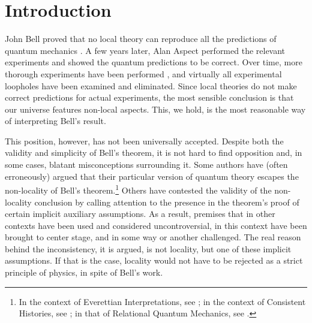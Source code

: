 \documentclass[letterpaper,12pt]{article}
\begin{document}
\onehalfspacing
\section{Introduction}
	
John Bell proved that no local theory can reproduce all the predictions of quantum mechanics \cite{Bell1964,Bell1971,Bell1976,Bell1990}. A few years later, Alan Aspect performed the relevant experiments \cite{Aspect1981,Aspect1982} and showed the quantum predictions to be correct. Over time, more thorough experiments have been performed \cite{weihs1998, Giustina2015, Shalm, Hensen2015}, and virtually all experimental loopholes have been examined and eliminated. Since local theories do not make correct predictions for actual experiments, the most sensible conclusion is that our universe features non-local aspects. This, we hold, is the most reasonable way of interpreting Bell's result.

This position, however, has not been universally accepted. Despite both the validity and simplicity of Bell's theorem, it is not hard to find opposition and, in some cases, blatant misconceptions surrounding it. Some authors have (often erroneously) argued that their particular version of quantum theory escapes the non-locality of Bell's theorem.\footnote{In the context of Everettian Interpretations, see \cite{wallace2012}; in the context of Consistent Histories, see \cite{griffiths2011}; in that of Relational Quantum Mechanics, see \cite{RovelliEPR}.} Others have contested the validity of the non-locality conclusion by calling attention to the presence in the theorem's proof of certain implicit auxiliary assumptions. As a result, premises that in other contexts have been used and considered uncontroversial, in this context have been brought to center stage, and in some way or another challenged. The real reason behind the inconsistency, it is argued, is not locality, but one of these implicit assumptions. If that is the case, locality would not have to be rejected as a strict principle of physics, in spite of Bell's work.
\end{document}
